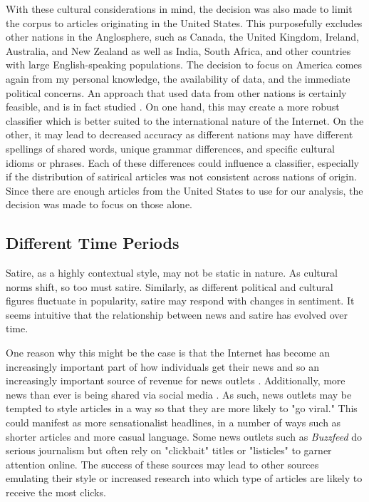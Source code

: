 \documentclass [12 pt] {report}
\begin{document}
With these cultural considerations in mind, the decision was also made to limit the corpus to articles originating in the United States. This purposefully excludes other nations in the Anglosphere, such as Canada, the United Kingdom, Ireland, Australia, and New Zealand as well as India, South Africa, and other countries with large English-speaking populations. The decision to focus on America comes again from my personal knowledge, the availability of data, and the immediate political concerns. An approach that used data from other nations is certainly feasible, and is in fact studied \cite{fakeNews} \cite{Yang}. On one hand, this may create a more robust classifier which is better suited to the international nature of the Internet. On the other, it may lead to decreased accuracy as different nations may have different spellings of shared words, unique grammar differences, and specific cultural idioms or phrases. Each of these differences could influence a classifier, especially if the distribution of satirical articles was not consistent across nations of origin. Since there are enough articles from the United States to use for our analysis, the decision was made to focus on those alone.

\subsection{Different Time Periods}
Satire, as a highly contextual style, may not be static in nature.  As cultural norms shift, so too must satire. Similarly, as different political and cultural figures fluctuate in popularity, satire may respond with changes in sentiment. It seems intuitive that the relationship between news and satire has evolved over time.

One reason why this might be the case is that the Internet has become an increasingly important part of how individuals get their news and so an increasingly important source of revenue for news outlets \cite{Gottfried}. Additionally, more news than ever is being shared via social media \cite{Shearer} \cite{newsSharing} \cite{trust}. As such, news outlets may be tempted to style articles in a way so that they are more likely to "go viral." This could manifest as more sensationalist headlines, in a number of ways such as shorter articles and more casual language. Some news outlets such as \textit{Buzzfeed} do serious journalism but often rely on "clickbait" titles or "listicles" to garner attention online. The success of these sources may lead to other sources emulating their style or increased research into which type of articles are likely to receive the most clicks.
\end{document}
